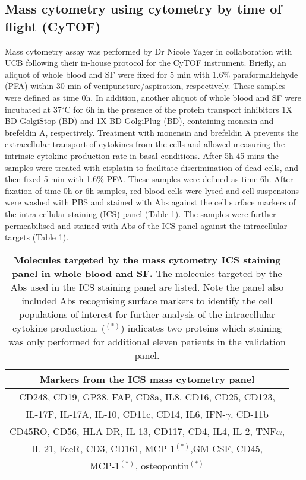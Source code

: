 \subsection{Mass cytometry using cytometry by time of flight (CyTOF)}
Mass cytometry assay was performed by Dr Nicole Yager in collaboration with UCB following their in-house protocol for the CyTOF instrument. Briefly, an aliquot of whole blood and SF were fixed for 5 min with 1.6\% paraformaldehyde (PFA) within 30 min of venipuncture/aspiration, respectively. These samples were defined as time 0h. In addition, another aliquot of whole blood and SF were incubated at 37{$^\circ$}C for 6h in the presence of the protein transport inhibitors 1X BD GolgiStop (BD) and 1X BD GolgiPlug (BD), containing monesin and brefeldin A, respectively. Treatment with monensin and brefeldin A prevents the extracellular transport of cytokines from the cells and allowed measuring the intrinsic cytokine production rate in basal conditions. After 5h 45 mins the samples were treated with cisplatin to facilitate discrimination of dead cells, and then fixed 5 min with 1.6\% PFA. These samples were defined as time 6h. After fixation of time 0h or 6h samples, red blood cells were lysed and cell suspensions were washed with PBS and stained with Abs against the cell surface markers of the intra-cellular staining (ICS) panel (Table \ref{tab:CyTOF}). The samples were further permeabilised and stained with Abs of the ICS panel against the intracellular targets (Table \ref{tab:CyTOF}). 



\begin{table}[htbp]
\setlength{\tabcolsep}{20pt}
\renewcommand{\arraystretch}{1.5}
\begin{tabular}{@{} c}
\toprule
\textbf{Markers from the ICS mass cytometry panel} \\
\midrule
\midrule
CD248, CD19, GP38, FAP, CD8a, IL8, CD16, CD25, CD123,\\
IL-17F, IL-17A, IL-10, CD11c, CD14, IL6, IFN-$\gamma$, CD-11b\\
CD45RO, CD56, HLA-DR, IL-13, CD117, CD4, IL4, IL-2, TNF$\alpha$,\\
IL-21, FceR, CD3, CD161, MCP-1$^{(\ast)}$,GM-CSF, CD45, \\
MCP-1$^{(\ast)}$, osteopontin$^{(\ast)}$\\ 
\end{tabular}
\medskip %
\caption[Molecules targeted by the mass cytometry ICS staining panel in whole blood and SF.]{\textbf{Molecules targeted by the mass cytometry ICS staining panel in whole blood and SF.} The molecules targeted by the Abs used in the ICS staining panel are listed. Note the panel also included Abs recognising surface markers to identify the cell populations of interest for further analysis of the intracellular cytokine production. ($^{(\ast)}$) indicates two proteins which staining was only performed for additional eleven patients in the validation panel.}
\label{tab:CyTOF}
\end{table}
\bigskip %




